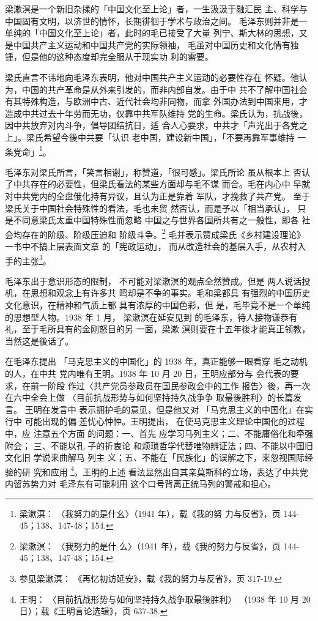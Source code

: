 梁漱溟是一个新旧杂揉的「中国文化至上论」者，一生汲汲于融汇民
主、科学与中国固有文明，以济世的情怀，长期徘徊于学术与政治之间。
毛泽东则并非是一单纯的「中国文化至上论」者，此时的毛已接受了大量
列宁、斯大林的思想，又是中国共产主义运动和中国共产党的实际领袖，
毛虽对中国历史和文化情有独锺，但是他的这种态度却完全服从于现实功
利的需要。

梁氏直言不讳地向毛泽东表明，他对中国共产主义运动的必要性存在 怀疑。他认
为，中国的共产革命是从外来引发的，而非内部自发。由于中 共不了解中国社会
有其特殊构造，与欧洲中古、近代社会均非同物，而拿 外国办法到中国来用，才
造成中共过去十年劳而无功，仅靠中共军队维持 党的生命。梁氏认为，抗战後，
因中共放弃对内斗争，倡导团结抗日，适 合人心要求，中共才「声光出于各党之
上」。梁氏希望今後中共要「认识 老中国，建设新中国」，「不要再靠军事维持
一条党命」\footnote{梁漱溟： 〈我努力的是什幺〉（1941 年），载《我的努
力与反省》，页 144-45；138、147-48；154.}。

毛泽东对梁氏所言，「笑言相谢」，称赞道，「很可感」。梁氏所论 虽从根本上
否认了中共存在的必要性，但梁氏看法的某些方面却与毛不谋 而合。毛在内心中
早就对中共党内的全盘俄化持有异议，且认为正是靠着 军队，才挽救了共产党。
至于梁氏关于中国社会特殊性的看法，毛也未贸 然否认，而是予以「相当承认」，
只是不同意梁氏太重中国特殊性而忽略 中国之与世界各国所共有之一般性，即各
社会均存在的阶级、阶级压迫和 阶级斗争。\footnote{梁漱溟： 〈我努力的是什
么〉（1941 年），载《我的努力与反省》，页 144-45；138、147-48；154.}
毛并表示赞成梁氏《乡村建设理论》一书中不搞上层表面文章 的「宪政运动」，
而从改造社会的基层入手，从农村入手的主张\footnote{参见梁漱溟：
《再忆初访延安》，载《我的努力与反省》，页 317-19.}。

毛泽东出于意识形态的限制，
不可能对梁漱溟的观点全然赞成。但是 两人说话投机，在思想和观念上有许多共
鸣却是不争的事实。毛和梁都具 有强烈的中国历史文化意识，在精神和气质上都
具有浓厚的中国色彩，但 是，毛毕竟不是一个单纯的思想型人物。1938 年 1 月，
梁漱溟在延安见到 的毛泽东，待人接物谦恭有礼，至于毛所具有的金刚怒目的另
一面，梁漱 溟则要在十五年後才能真正领教，当然这是後话了。

在毛泽东提出 「马克思主义的中国化」的 1938 年，真正能够一眼看穿 毛之动机
的人，在中共 党内唯有王明。1938 年 10 月 20 日，王明应部分与 会代表的要
求，在前一阶段 作过〈共产党员参政员在国民参政会中的工作 报告〉後，再一次
在六中全会上做 〈目前抗战形势与如何坚持持久战争争 取最後胜利〉的长篇发言。
王明在发言中 表示拥护毛的意见，但是他又对 「马克思主义的中国化」在实行中
可能出现的偏 差忧心忡忡。王明提出， 在使马克思主义理论中国化的过程中，应
注意五个方面 的问题：一、首先 应学习马列主义；二、不能庸俗化和牵强附会；
三、不能以孔 子的折衷论 和烦琐哲学代替唯物辨证法；四、不能以中国旧文化旧
学说来曲解马 列主 义；五、不能在「民族化」的误解之下，来忽视国际经验的研
究和应用 \footnote{王明： 〈目前抗战形势与如何坚持持久战争取最後胜利〉
（1938 年 10 月 20 日）；载《王明言论选辑》，页 637-38. }。王明的上述
看法显然出自其亲莫斯科的立场，表达了中共党内留苏势力对 毛泽东有可能利用
这个口号背离正统马列的警戒和担心。

